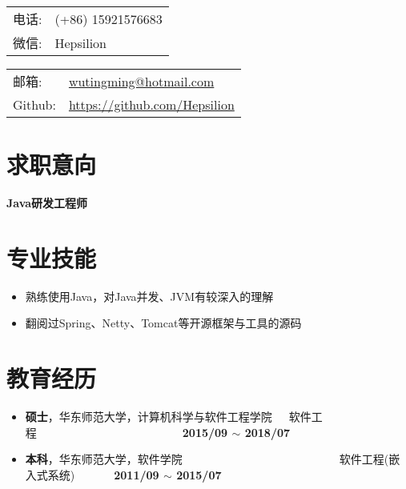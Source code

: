 \documentclass[letterpaper, UTF8, 11pt]{article}
\def\name{\textbf{\textcolor[rgb]{0.00, 0.00, 0.00}{\fontsize{30pt}{30pt}吴庭明}} ~~~~~~~~~ \fontsize{15pt}{15pt}}
\begin{document}
	
	\noindent{\bf \name} 
	\vspace{0.1in}

	\begin{minipage}{0.45\linewidth}
		\begin{tabular}{ll}
			电话:   & (+86) 15921576683 \\
			微信:   & Hepsilion \\
		\end{tabular}
	\end{minipage}
	\begin{minipage}{0.45\linewidth}
		\begin{tabular}{ll}
			邮箱:   & \href{mailto:wutingming@hotmail.com}{ wutingming@hotmail.com} \\
			Github: & \href{https://github.com/Hepsilion}{https://github.com/Hepsilion}\\
		\end{tabular}
	\end{minipage}
	\vspace{-0.1in}
	
	\section*{\textbf{求职意向}}\vspace{-0.12in}
		\item \textbf{Java研发工程师}
	\vspace{-0.25in}
	
	\section*{\textbf{专业技能}}\vspace{-0.12in}
	\begin{itemize}
		\item 熟练使用Java，对Java并发、JVM有较深入的理解
		\item 翻阅过Spring、Netty、Tomcat等开源框架与工具的源码
	\end{itemize}
	\vspace{-0.32in}
	
	\section*{\textbf{教育经历}}\vspace{-0.12in}
	\begin{itemize}
		\item \textbf{硕士}，华东师范大学，计算机科学与软件工程学院~~~软件工程~~~~~~~~~~~~~~~~~~~~~~~~~~\textbf{2015/09 $\sim$ 2018/07}
		\item \textbf{本科}，华东师范大学，软件学院~~~~~~~~~~~~~~~~~~~~~~~~~~~~软件工程(嵌入式系统)~~~~~~~\textbf{2011/09 $\sim$ 2015/07}
	\end{itemize}
	\vspace{-0.32in}
	
\end{document}
